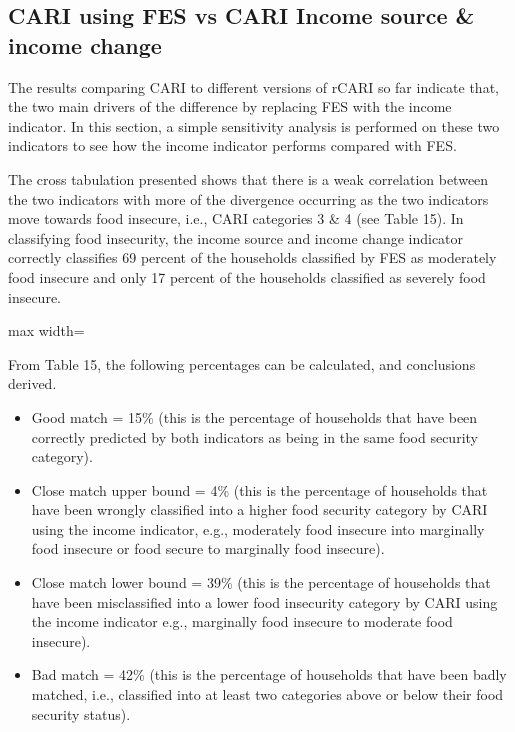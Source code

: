 \documentclass[11pt,harvard]{article}
\begin{document}
\subsection{CARI using FES vs CARI Income source \& income change}
The results comparing CARI to different versions of rCARI so far indicate that, the two main drivers of the difference by replacing FES with the income indicator. In this section, a simple sensitivity analysis is performed on these two indicators to see how the income indicator performs compared with FES.

The cross tabulation presented shows that there is a weak correlation between the two indicators with more of the divergence occurring as the two indicators move towards food insecure, i.e., CARI categories 3 \& 4 (see Table 15). In classifying food insecurity, the income source and income change indicator correctly classifies 69 percent of the households classified by FES as moderately food insecure and only 17 percent of the households classified as severely food insecure.  

\begin{table}[htbp]
	\centering
	\begin{adjustbox}{max width=\textwidth}
		\begin{threeparttable}
			\caption{Cross Tabulation of CARI\_FES vs. CARI\_Income}
			\scriptsize
			 
			\label{tab:CAR_FS_Cat_Cross_Tabulation}
		\end{threeparttable}
	\end{adjustbox}
\end{table}

From Table 15, the following percentages can be calculated, and conclusions derived.

\begin{itemize}
	\item Good match = 15\% (this is the percentage of households that have been correctly predicted by both indicators as being in the same food security category).
	\item Close match upper bound = 4\% (this is the percentage of households that have been wrongly classified into a higher food security category by CARI using the income indicator, e.g., moderately food insecure into marginally food insecure or food secure to marginally food insecure).
	\item Close match lower bound = 39\% (this is the percentage of households that have been misclassified into a lower food insecurity category by CARI using the income indicator e.g., marginally food insecure to moderate food insecure).
	\item Bad match = 42\% (this is the percentage of households that have been badly matched, i.e., classified into at least two categories above or below their food security status).
\end{itemize}
\end{document}
